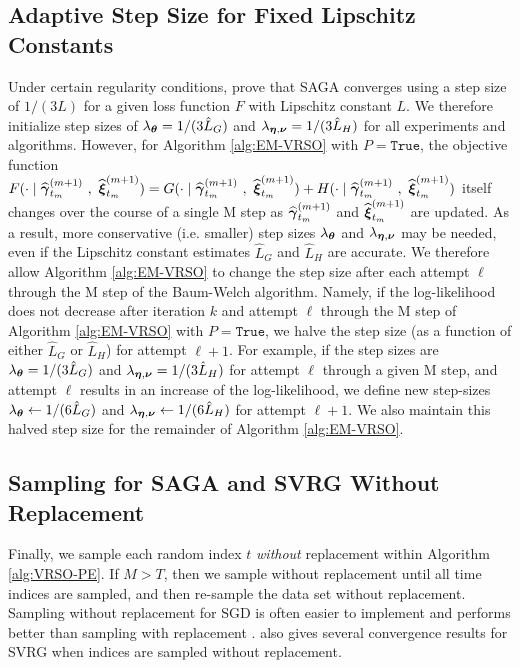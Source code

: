 \subsection{Adaptive Step Size for Fixed Lipschitz Constants}
\label{subsec:L_divider}

Under certain regularity conditions, \citet{Defazio:2014} prove that SAGA converges using a step size of $1/(3L)$ for a given loss function $F$ with Lipschitz constant $L$. We therefore initialize step sizes of $\lambda_{\boldsymbol{\theta}} = 1/(3 \hat L_G)$ and $\lambda_{\boldsymbol{\eta},\boldsymbol{\nu}} = 1/(3 \hat L_H)$ for all experiments and algorithms. However, for Algorithm \ref{alg:EM-VRSO} with $P = \texttt{True}$, the objective function $F(\cdot \mid \widehat {\boldsymbol{\gamma}}_{t_m}^{(m+1)} ~,~ \widehat {\boldsymbol{\xi}}_{t_m}^{(m+1)}) = G(\cdot \mid \widehat {\boldsymbol{\gamma}}_{t_m}^{(m+1)} ~,~ \widehat {\boldsymbol{\xi}}_{t_m}^{(m+1)}) + H(\cdot \mid \widehat {\boldsymbol{\gamma}}_{t_m}^{(m+1)} ~,~ \widehat {\boldsymbol{\xi}}_{t_m}^{(m+1)})$ itself changes over the course of a single M step as $\widehat {\boldsymbol{\gamma}}_{t_m}^{(m+1)}$ and $\widehat {\boldsymbol{\xi}}_{t_m}^{(m+1)}$ are updated. As a result, more conservative (i.e. smaller) step sizes $\lambda_{\boldsymbol{\theta}}$ and $\lambda_{\boldsymbol{\eta},\boldsymbol{\nu}}$ may be needed, even if the Lipschitz constant estimates $\hat L_G$ and $\hat L_H$ are accurate. We therefore allow Algorithm \ref{alg:EM-VRSO} to change the step size after each attempt $\ell$ through the M step of the Baum-Welch algorithm. Namely, if the log-likelihood does not decrease after iteration $k$ and attempt $\ell$ through the M step of Algorithm \ref{alg:EM-VRSO} with $P = \texttt{True}$, we halve the step size (as a function of either $\hat L_G$ or $\hat L_H$) for attempt $\ell+1$. For example, if the step sizes are $\lambda_{\boldsymbol{\theta}} = 1/(3 \hat L_G)$ and $\lambda_{\boldsymbol{\eta},\boldsymbol{\nu}} = 1/(3 \hat L_H)$ for attempt $\ell$ through a given M step, and attempt $\ell$ results in an increase of the log-likelihood, we define new step-sizes $\lambda_{\boldsymbol{\theta}} \leftarrow 1/(6 \hat L_G)$ and $\lambda_{\boldsymbol{\eta},\boldsymbol{\nu}} \leftarrow 1/(6 \hat L_H)$ for attempt $\ell+1$. We also maintain this halved step size for the remainder of Algorithm \ref{alg:EM-VRSO}.

\subsection{Sampling for SAGA and SVRG Without Replacement}
\label{subsec:wo_replacement}

Finally, we sample each random index $t$ \textit{without} replacement within Algorithm \ref{alg:VRSO-PE}. If $M > T$, then we sample without replacement until all time indices are sampled, and then re-sample the data set without replacement. Sampling without replacement for SGD is often easier to implement and performs better than sampling with replacement \citep{Gurbuzbalaban:2015}. \citet{Ohad:2016} also gives several convergence results for SVRG when indices are sampled without replacement.